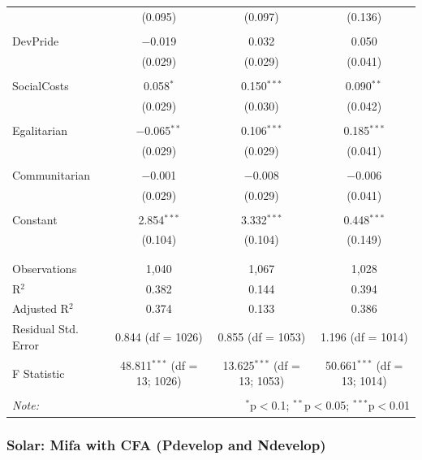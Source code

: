 \documentclass[
]{article}
\begin{document}
\begin{table}[!htbp]
\begin{tabular}{@{\extracolsep{5pt}}lccc}
  & (0.095) & (0.097) & (0.136) \\ 
  & & & \\ 
 DevPride & $-$0.019 & 0.032 & 0.050 \\ 
  & (0.029) & (0.029) & (0.041) \\ 
  & & & \\ 
 SocialCosts & 0.058$^{*}$ & 0.150$^{***}$ & 0.090$^{**}$ \\ 
  & (0.029) & (0.030) & (0.042) \\ 
  & & & \\ 
 Egalitarian & $-$0.065$^{**}$ & 0.106$^{***}$ & 0.185$^{***}$ \\ 
  & (0.029) & (0.029) & (0.041) \\ 
  & & & \\ 
 Communitarian & $-$0.001 & $-$0.008 & $-$0.006 \\ 
  & (0.029) & (0.029) & (0.041) \\ 
  & & & \\ 
 Constant & 2.854$^{***}$ & 3.332$^{***}$ & 0.448$^{***}$ \\ 
  & (0.104) & (0.104) & (0.149) \\ 
  & & & \\ 
\hline \\[-1.8ex] 
Observations & 1,040 & 1,067 & 1,028 \\ 
R$^{2}$ & 0.382 & 0.144 & 0.394 \\ 
Adjusted R$^{2}$ & 0.374 & 0.133 & 0.386 \\ 
Residual Std. Error & 0.844 (df = 1026) & 0.855 (df = 1053) & 1.196 (df = 1014) \\ 
F Statistic & 48.811$^{***}$ (df = 13; 1026) & 13.625$^{***}$ (df = 13; 1053) & 50.661$^{***}$ (df = 13; 1014) \\ 
\hline 
\hline \\[-1.8ex] 
\textit{Note:}  & \multicolumn{3}{r}{$^{*}$p$<$0.1; $^{**}$p$<$0.05; $^{***}$p$<$0.01} \\ 
\end{tabular} 
\end{table} 
\endgroup

\hypertarget{solar-mifa-with-cfa-pdevelop-and-ndevelop}{%
\subsubsection{Solar: Mifa with CFA (Pdevelop and
Ndevelop)}\label{solar-mifa-with-cfa-pdevelop-and-ndevelop}}
\end{document}

